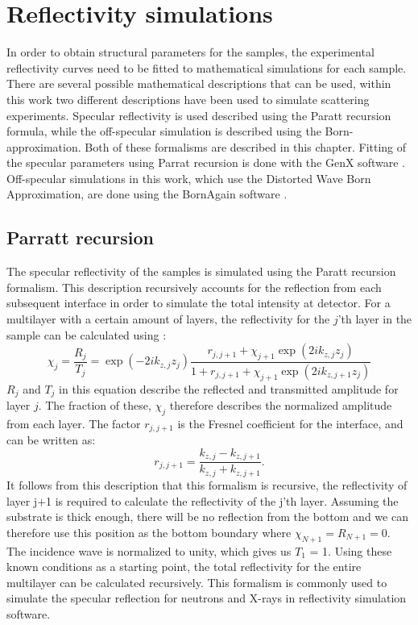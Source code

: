 \chapter{Reflectivity simulations}\label{reflectivitysimulations}
In order to obtain structural parameters for the samples, the experimental reflectivity curves need to be fitted to mathematical simulations for each sample. There are several possible mathematical descriptions that can be used, within this work two different descriptions have been used to simulate scattering experiments. Specular reflectivity is used described using the Paratt recursion formula, while the off-specular simulation is described using the Born-approximation. Both of these formalisms are described in this chapter. Fitting of the specular parameters using Parrat recursion is done with the GenX software \cite{genx} \cite{genx_new}. Off-specular simulations in this work, which use the Distorted Wave Born Approximation, are done using the BornAgain software \cite{BornAgain}.

\section{Parratt recursion}
The specular reflectivity of the samples is simulated using the Paratt recursion formalism. This description recursively accounts for the reflection from each subsequent interface in order to simulate the total intensity at detector. For a multilayer with a certain amount of layers, the reflectivity for the $j$'th layer in the sample can be calculated using \cite{parratt_recursion}: 
\begin{equation}
	\chi_j = \frac{R_j}{T_j}  = \exp(-2ik_{z,j}z_j)\frac{r_{j,j+1} + \chi_{j+1} \exp(2ik_{z,j}z_j)}{1 + r_{j,j+1} + \chi_{j+1} \exp(2ik_{z,j+1}z_j)}
\end{equation}
$R_j$ and $T_j$ in this equation describe the reflected and transmitted amplitude for layer $j$. The fraction of these, $\chi_j$ therefore describes the normalized amplitude from each layer. The factor $r_{j,j+1}$ is the Fresnel coefficient for the interface, and can be written as:
\begin{equation}
	r_{j,j+1} =  \frac{k_{z,j} - k_{z,j+1}}{k_{z,j} + k_{z,j+1}}.
\end{equation}
It follows from this description that this formalism is recursive, the reflectivity of layer j+1 is required to calculate the reflectivity of the j'th layer. Assuming the substrate is thick enough, there will be no reflection from the bottom and we can therefore use this position as the bottom boundary where $\chi_{N+1} = R_{N+1} = 0$. The incidence wave is normalized to unity, which gives us $T_1$ = 1. Using these known conditions as a starting point, the total reflectivity for the entire multilayer can be calculated recursively. This formalism is commonly used to simulate the specular reflection for neutrons and X-rays in reflectivity simulation software.
